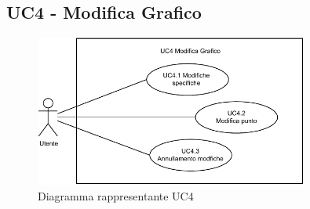 \newpage
\subsection{UC4 - Modifica Grafico}
\label{subsec:uc4}

\begin{figure}[h]
    \centering
    \includegraphics[width=0.8\textwidth]{componenti/casi-duso/diagrammi/UC4.pdf}
    \caption{Diagramma rappresentante UC4}
    \label{fig:UC4}
\end{figure}


